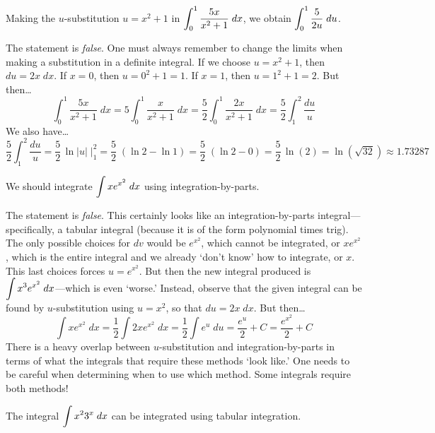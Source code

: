 \documentclass[11pt,letterpaper]{article}
\begin{document}
\thispagestyle{title}

 Making the $u$-substitution $u= x^2 + 1$ in $\displaystyle\int_0^1 \dfrac{5x}{x^2 + 1}\;dx$, we obtain $\displaystyle\int_0^1 \dfrac{5}{2u} \;du$. \pspace

\sol The statement is \textit{false}. One must always remember to change the limits when making a substitution in a definite integral. If we choose $u= x^2 + 1$, then $du= 2x \;dx$. If $x= 0$, then $u= 0^2 + 1= 1$. If $x= 1$, then $u= 1^2 + 1= 2$. But then\dots
	\[
	\int_0^1 \dfrac{5x}{x^2 + 1}\;dx= 5 \int_0^1 \dfrac{x}{x^2 + 1}\;dx= \dfrac{5}{2} \int_0^1 \dfrac{2x}{x^2 + 1}\;dx= \dfrac{5}{2} \int_1^2 \dfrac{du}{u}
	\]
We also have\dots
	\[
	\dfrac{5}{2} \int_1^2 \dfrac{du}{u}= \dfrac{5}{2}\,\ln|u| \;\bigg|_1^2= \dfrac{5}{2}\; ( \ln 2 - \ln 1)= \dfrac{5}{2}\; ( \ln 2 - 0)= \dfrac{5}{2}\,\ln(2)= \ln(\sqrt{32}) \approx 1.73287
	\] \pvspace{1.3cm}



 We should integrate $\displaystyle\int x e^{x^2} \;dx$ using integration-by-parts. \pspace

\sol The statement is \textit{false}. This certainly looks like an integration-by-parts integral---specifically, a tabular integral (because it is of the form polynomial times trig). The only possible choices for $dv$ would be $e^{x^2}$, which cannot be integrated, or $x e^{x^2}$, which is the entire integral and we already `don't know' how to integrate, or $x$. This last choices forces $u= e^{x^2}$. But then the new integral produced is $\displaystyle\int x^3 e^{x^2} \;dx$---which is even `worse.' Instead, observe that the given integral can be found by $u$-substitution using $u= x^2$, so that $du= 2x \;dx$. But then\dots
	\[
	\int x e^{x^2} \;dx= \dfrac{1}{2} \int 2x e^{x^2} \;dx= \dfrac{1}{2} \int e^u \;du= \dfrac{e^u}{2} + C= \dfrac{e^{x^2}}{2} + C
	\]
There is a heavy overlap between $u$-substitution and integration-by-parts in terms of what the integrals that require these methods `look like.' One needs to be careful when determining when to use which method. Some integrals require both methods! \pvspace{1.3cm}



 The integral $\displaystyle\int x^2 3^x \;dx$ can be integrated using tabular integration. \pspace
\end{document}

